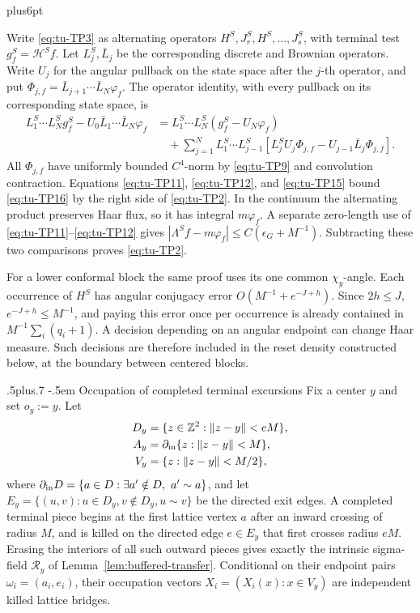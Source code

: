 \documentclass[12pt,reqno]{amsart}
\makeatletter
\def\subsection{\@startsection{subsection}{2}{0pt}%
  {.5\linespacing plus.7\linespacing}
  {-.5em}
  {\normalfont\scshape}}
\theoremstyle{plain}
\theoremstyle{definition}
\theoremstyle{remark}
\renewenvironment{proof}[1][\proofname]{%
  \par
  \pushQED{\qed}%
  \normalfont
  \topsep6pt plus6pt\relax
  \trivlist
  \item[\hskip\labelsep\slshape #1\@addpunct{.}]%
  \ignorespaces
}{%
  \popQED
  \endtrivlist
  \@endpefalse
}
\DeclareRobustCommand{\qed}{%
  \leavevmode\unskip\penalty9999\hbox{}\nobreak
  \ifmmode
    \makebox[0pt][l]{\qquad\hbox{\qedsymbol}}%
  \else
    \qquad\hbox{\qedsymbol}%
  \fi
}
\renewcommand{\qedsymbol}{\rule[.47pt]{4pt}{6pt}}
\numberwithin{equation}{section}
\makeatother
\begin{document}
\begin{proof}[Proof of Lemma~\ref{lem:typed-centered-endpoint-product}]
Write \eqref{eq:tu-TP3} as alternating operators
\(H^S,J_r^S,H^S,\ldots,J_s^S\), with terminal test
\(g_f^S=\mathcal{H}^Sf\).  Let \(L_j^S,\bar L_j\) be the corresponding
discrete and Brownian operators. Write \(U_j\) for the angular pullback
on the state space after the \(j\)-th operator, and put
\(\Phi_{j,f}=\bar L_{j+1}\cdots\bar L_N\varphi_f\).  The operator identity, with every pullback on its corresponding state
space, is
\begin{equation}
\begin{split}
 L_1^S\cdots L_N^Sg_f^S-U_0\bar L_1\cdots\bar L_N\varphi_f
 &=L_1^S\cdots L_N^S(g_f^S-U_N\varphi_f)\\
 &\quad+\sum_{j=1}^NL_1^S\cdots L_{j-1}^S
 [L_j^SU_j\Phi_{j,f}-U_{j-1}\bar L_j\Phi_{j,f}].          \end{split}
\label{eq:tu-TP16}
\end{equation}
All \(\Phi_{j,f}\) have uniformly bounded \(C^4\)-norm by \eqref{eq:tu-TP9} and
convolution contraction.  Equations \eqref{eq:tu-TP11}, \eqref{eq:tu-TP12}, and \eqref{eq:tu-TP15} bound
\eqref{eq:tu-TP16} by the right side of \eqref{eq:tu-TP2}.  In the continuum the alternating
product preserves Haar flux, so it has integral \(m\varphi_f\).  A
separate zero-length use of \eqref{eq:tu-TP11}--\eqref{eq:tu-TP12} gives
\(|\Lambda^Sf-m\varphi_f|\le C(\epsilon_G+M^{-1})\).
Subtracting these two comparisons proves \eqref{eq:tu-TP2}.

For a lower conformal block the same proof uses its one common
\(\chi_y\)-angle.  Each occurrence of \(H^S\) has angular conjugacy error
\(O(M^{-1}+e^{-J+h})\).  Since \(2h\le J\),
\(e^{-J+h}\le M^{-1}\), and paying this error once per occurrence is
already contained in \(M^{-1}\sum_i(q_i+1)\). A decision depending on
an angular endpoint can change Haar measure. Such decisions are therefore
included in the reset density constructed below, at the boundary between
centered blocks.
\end{proof}

\subsection{Occupation of completed terminal excursions}
Fix a center \(y\) and set \(o_y:=y\).  Let
\[
\begin{aligned}
 D_y&=\{z\in\mathbb Z^2:\|z-y\|<eM\},\\
 A_y&=\partial_{\rm in}\{z:\|z-y\|<M\},\\
 V_y&=\{z:\|z-y\|<M/2\},
\end{aligned}
\]
where \(\partial_{\rm in}D=\{a\in D:\exists a'\notin D,\ a'\sim a\}\),
and let \(E_y=\{(u,v):u\in D_y,v\notin D_y,u\sim v\}\) be the directed
exit edges.  A completed
terminal piece begins at the first lattice vertex \(a\) after an inward
crossing of radius \(M\), and is killed on the directed edge \(e\in E_y\)
that first crosses radius \(eM\).  Erasing the interiors of all such
outward pieces gives exactly the intrinsic sigma-field \(\mathcal{R}_y\) of
Lemma~\ref{lem:buffered-transfer}.  Conditional on their endpoint pairs
\(\omega_i=(a_i,e_i)\), their occupation vectors
\(X_i=(X_i(x):x\in V_y)\) are independent killed lattice bridges.
\end{document}
